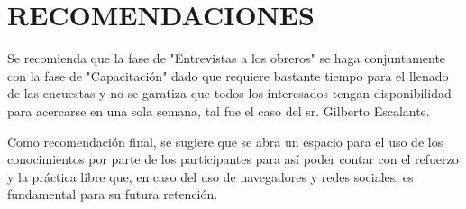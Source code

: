 \chapter*{RECOMENDACIONES}
    Se recomienda que la fase de "Entrevistas a los obreros" se haga conjuntamente con la fase de "Capacitación" dado que requiere bastante tiempo para el llenado de las encuestas y no se garatiza que todos los interesados tengan disponibilidad para acercarse en una sola semana, tal fue el caso del sr. Gilberto Escalante.
    
    Como recomendación final, se sugiere que se abra un espacio para el uso de los conocimientos por parte de los participantes para así poder contar con el refuerzo y la práctica libre que, en caso del uso de navegadores y redes sociales, es fundamental para su futura retención.
    
    \pagebreak